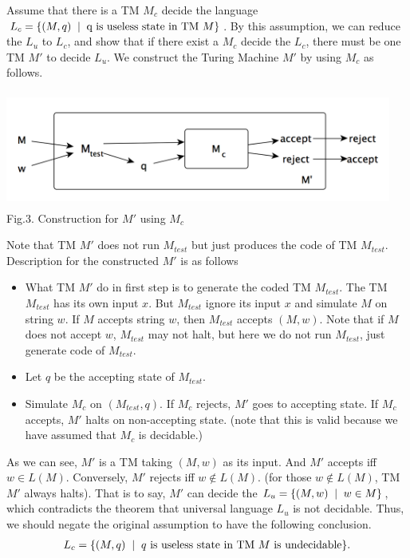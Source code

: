 \documentclass[11pt,a4paper]{article}
\newcommand{\htab}{\hspace*{0.63cm}}
\newcommand{\ba}{\hspace*{0.2cm} | \hspace*{0.2cm}}
\newcommand{\pg}{\\[0.3cm]}
\newcommand{\lu}{L_{u}}
\begin{document}
 \htab Assume that there is a TM $M_{c}$ decide the language $L_{c}=\{(M,q)\ba \text{q is useless state in TM }M\}$.
 By this assumption, we can reduce the $\lu$ to $L_{c}$, and show that if there exist a $M_{c}$ decide
 the $L_{c}$, there must be one TM $M'$ to decide $\lu$. We construct the  
 Turing Machine $M'$ by using $M_{c}$ as follows.
 \begin{center}
 \includegraphics[width=5in,height=1.5in]{./TM3.png} \\
 \footnotesize Fig.3. Construction for $M'$ using $M_{c}$
 \end{center}
 \htab Note that TM $M'$ does not run $M_{test}$ but just produces the code of TM $M_{test}$. \pg
 \htab Description for the constructed $M'$ is as follows
 \begin{itemize} 
     \item{What TM $M'$ do in first step is to generate the coded TM $M_{test}$. The TM $M_{test}$ has
         its own input $x$. But $M_{test}$ ignore its input $x$ and simulate $M$ on string $w$. If 
     $M$ accepts string $w$, then $M_{test}$ accepts $(M,w)$. Note that if $M$ does not accept $w$,
 $M_{test}$ may not halt, but here we do not run $M_{test}$, just generate code of $M_{test}$.}
     \item{Let $q$ be the accepting state of $M_{test}$. }
     \item{Simulate $M_{c}$ on $(M_{test}, q)$. If $M_{c}$ rejects, $M'$ goes to accepting state. 
         If $M_{c}$ accepts, $M'$ halts on non-accepting state. (note that this is valid because
     we have assumed that $M_{c}$ is decidable.)}
 \end{itemize}
 \htab As we can see, $M'$ is a TM taking $(M,w)$ as its input. And $M'$ accepts iff $w \in L(M)$. 
 Conversely, $M'$ rejects iff $w \notin L(M)$. (for those $w \notin L(M)$, TM $M'$ always halts).
 That is to say, $M'$ can decide the $\lu= \{(M,w)\ba w\in M \}$, which contradicts the theorem 
 that universal language $\lu$ is not decidable. Thus, we should negate the original assumption 
 to have the following conclusion. 
 \begin{align}
     L_{c}=\{(M,q)\ba \text{$q$ is useless state in TM $M$ is undecidable} \}. 
 \end{align}
\end{document}
